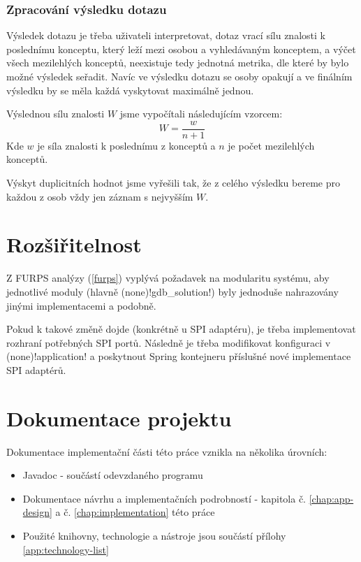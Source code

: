 \subsubsection{Zpracování výsledku dotazu}
Výsledek dotazu je třeba uživateli interpretovat, dotaz vrací sílu znalosti k poslednímu konceptu, který leží mezi osobou a vyhledávaným konceptem, a výčet všech mezilehlých konceptů, neexistuje tedy jednotná metrika, dle které by bylo možné výsledek seřadit. Navíc ve výsledku dotazu se osoby opakují a ve finálním výsledku by se měla každá vyskytovat maximálně jednou.\par
\noindent Výslednou sílu znalosti $W$ jsme vypočítali následujícím vzorcem:
$$W=\frac{w}{n +1}$$
Kde $w$ je síla znalosti k poslednímu z konceptů a $n$ je počet mezilehlých konceptů.\par
Výskyt duplicitních hodnot jsme vyřešili tak, že z celého výsledku bereme pro každou z osob vždy jen záznam s nejvyšším $W$.
\section{Rozšiřitelnost}
Z FURPS analýzy (\ref{furps}) vyplývá požadavek na modularitu systému, aby jednotlivé moduly (hlavně \ctulst(none)!gdb_solution!) byly jednoduše nahrazovány jinými implementacemi a podobně.\par
Pokud k takové změně dojde (konkrétně u SPI adaptéru), je třeba implementovat rozhraní potřebných SPI portů. Následně je třeba modifikovat konfiguraci v \ctulst(none)!application! a poskytnout Spring kontejneru příslušné nové implementace SPI adaptérů.
\section{Dokumentace projektu}
Dokumentace implementační části této práce vznikla na několika úrovních:
\begin{itemize}
    \item Javadoc - součástí odevzdaného programu
    \item Dokumentace návrhu a implementačních podrobností - kapitola č. \ref{chap:app-design} a č. \ref{chap:implementation} této práce
    \item Použité knihovny, technologie a nástroje jsou součástí přílohy \ref{app:technology-list}
\end{itemize}

